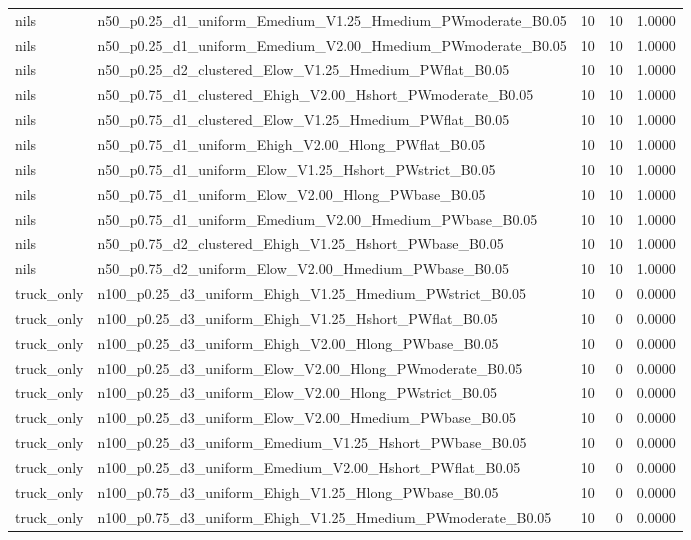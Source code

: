 \begin{tabular}{llrrr}
nils & n50_p0.25_d1_uniform_Emedium_V1.25_Hmedium_PWmoderate_B0.05 & 10 & 10 & 1.0000 \\
nils & n50_p0.25_d1_uniform_Emedium_V2.00_Hmedium_PWmoderate_B0.05 & 10 & 10 & 1.0000 \\
nils & n50_p0.25_d2_clustered_Elow_V1.25_Hmedium_PWflat_B0.05 & 10 & 10 & 1.0000 \\
nils & n50_p0.75_d1_clustered_Ehigh_V2.00_Hshort_PWmoderate_B0.05 & 10 & 10 & 1.0000 \\
nils & n50_p0.75_d1_clustered_Elow_V1.25_Hmedium_PWflat_B0.05 & 10 & 10 & 1.0000 \\
nils & n50_p0.75_d1_uniform_Ehigh_V2.00_Hlong_PWflat_B0.05 & 10 & 10 & 1.0000 \\
nils & n50_p0.75_d1_uniform_Elow_V1.25_Hshort_PWstrict_B0.05 & 10 & 10 & 1.0000 \\
nils & n50_p0.75_d1_uniform_Elow_V2.00_Hlong_PWbase_B0.05 & 10 & 10 & 1.0000 \\
nils & n50_p0.75_d1_uniform_Emedium_V2.00_Hmedium_PWbase_B0.05 & 10 & 10 & 1.0000 \\
nils & n50_p0.75_d2_clustered_Ehigh_V1.25_Hshort_PWbase_B0.05 & 10 & 10 & 1.0000 \\
nils & n50_p0.75_d2_uniform_Elow_V2.00_Hmedium_PWbase_B0.05 & 10 & 10 & 1.0000 \\
truck_only & n100_p0.25_d3_uniform_Ehigh_V1.25_Hmedium_PWstrict_B0.05 & 10 & 0 & 0.0000 \\
truck_only & n100_p0.25_d3_uniform_Ehigh_V1.25_Hshort_PWflat_B0.05 & 10 & 0 & 0.0000 \\
truck_only & n100_p0.25_d3_uniform_Ehigh_V2.00_Hlong_PWbase_B0.05 & 10 & 0 & 0.0000 \\
truck_only & n100_p0.25_d3_uniform_Elow_V2.00_Hlong_PWmoderate_B0.05 & 10 & 0 & 0.0000 \\
truck_only & n100_p0.25_d3_uniform_Elow_V2.00_Hlong_PWstrict_B0.05 & 10 & 0 & 0.0000 \\
truck_only & n100_p0.25_d3_uniform_Elow_V2.00_Hmedium_PWbase_B0.05 & 10 & 0 & 0.0000 \\
truck_only & n100_p0.25_d3_uniform_Emedium_V1.25_Hshort_PWbase_B0.05 & 10 & 0 & 0.0000 \\
truck_only & n100_p0.25_d3_uniform_Emedium_V2.00_Hshort_PWflat_B0.05 & 10 & 0 & 0.0000 \\
truck_only & n100_p0.75_d3_uniform_Ehigh_V1.25_Hlong_PWbase_B0.05 & 10 & 0 & 0.0000 \\
truck_only & n100_p0.75_d3_uniform_Ehigh_V1.25_Hmedium_PWmoderate_B0.05 & 10 & 0 & 0.0000 \\

\end{tabular}

